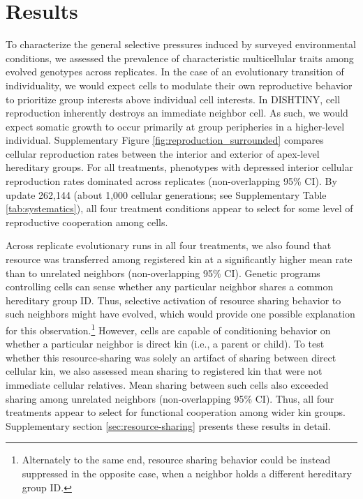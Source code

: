 \section{Results}

To characterize the general selective pressures induced by surveyed environmental conditions, we assessed the prevalence of characteristic multicellular traits among evolved genotypes across replicates.
In the case of an evolutionary transition of individuality, we would expect cells to modulate their own reproductive behavior to prioritize group interests above individual cell interests.
In DISHTINY, cell reproduction inherently destroys an immediate neighbor cell.
As such, we would expect somatic growth to occur primarily at group peripheries in a higher-level individual.
Supplementary Figure \ref{fig:reproduction_surrounded} compares cellular reproduction rates between the interior and exterior of apex-level hereditary groups.
For all treatments, phenotypes with depressed interior cellular reproduction rates dominated across replicates (non-overlapping 95\% CI).
By update 262,144 (about 1,000 cellular generations; see Supplementary Table \ref{tab:systematics}), all four treatment conditions appear to select for some level of reproductive cooperation among cells.

Across replicate evolutionary runs in all four treatments, we also found that resource was transferred among registered kin at a significantly higher mean rate than to unrelated neighbors (non-overlapping 95\% CI).
Genetic programs controlling cells can sense whether any particular neighbor shares a common hereditary group ID.
Thus, selective activation of resource sharing behavior to such neighbors might have evolved, which would provide one possible explanation for this observation.\footnote{
Alternately to the same end, resource sharing behavior could be instead suppressed in the opposite case, when a neighbor holds a different hereditary group ID.
}
However, cells are capable of conditioning behavior on whether a particular neighbor is direct kin (i.e., a parent or child).
To test whether this resource-sharing was solely an artifact of sharing between direct cellular kin, we also assessed mean sharing to registered kin that were not immediate cellular relatives.
Mean sharing between such cells also exceeded sharing among unrelated neighbors (non-overlapping 95\% CI).
Thus, all four treatments appear to select for functional cooperation among wider kin groups.
Supplementary section \ref{sec:resource-sharing} presents these results in detail.

